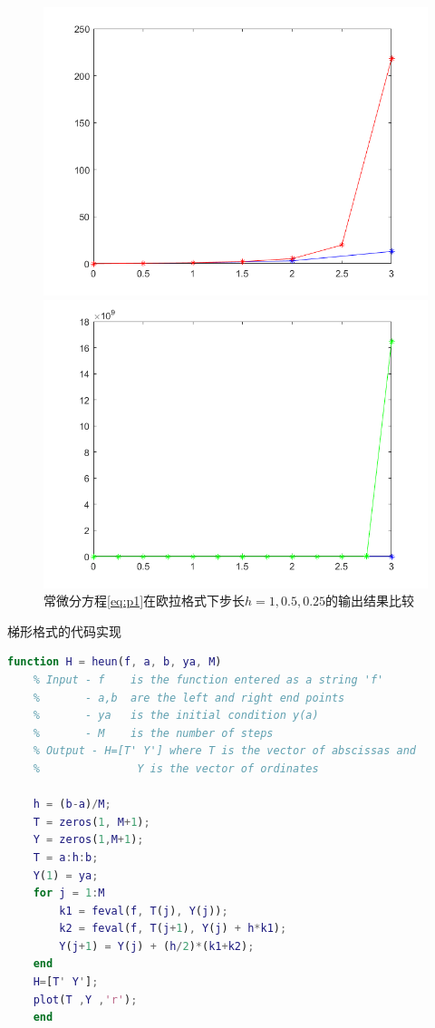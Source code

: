 \documentclass[UTF8]{ctexart}
\begin{document}
\begin{figure}[H]
	\centering
	\begin{minipage}[c]{0.5\textwidth}
		\centering
		\includegraphics[width=0.7\columnwidth]{figures/p1euler1.png}
	\end{minipage}%
	\begin{minipage}[c]{0.5\textwidth}
		\centering
		\includegraphics[width=0.7\columnwidth]{figures/p1euler2.png}
	\end{minipage}
	\caption{常微分方程\ref{eq:p1}在欧拉格式下步长$h=1, 0.5, 0.25$的输出结果比较}
\end{figure}
梯形格式的代码实现
\begin{lstlisting}[language=matlab]
	function H = heun(f, a, b, ya, M)
	% Input - f    is the function entered as a string 'f'
	%       - a,b  are the left and right end points
	%       - ya   is the initial condition y(a)
	%       - M    is the number of steps
	% Output - H=[T' Y'] where T is the vector of abscissas and
	%               Y is the vector of ordinates
	
	h = (b-a)/M;
	T = zeros(1, M+1);
	Y = zeros(1,M+1);
	T = a:h:b;
	Y(1) = ya;
	for j = 1:M
		k1 = feval(f, T(j), Y(j));
		k2 = feval(f, T(j+1), Y(j) + h*k1);
		Y(j+1) = Y(j) + (h/2)*(k1+k2);
	end
	H=[T' Y'];
	plot(T ,Y ,'r');
	end
\end{lstlisting}
\end{document}
